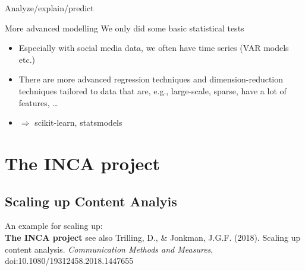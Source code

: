 \documentclass{beamer}
\begin{document}
\begin{frame}{Analyze/explain/predict}
	\begin{block}{More advanced modelling}
We only did some basic statistical tests
		\begin{itemize}
			\item Especially with social media data, we often have time series (VAR models etc.)
			\item There are more advanced regression techniques and dimension-reduction techniques tailored to data that are, e.g., large-scale, sparse, have a lot of features, \ldots
		\item $\Rightarrow$ scikit-learn, statsmodels
		\end{itemize}
	\end{block}
\end{frame}










\section{The INCA project}
\subsection{Scaling up Content Analyis}
\begin{frame}[plain]{}
An example for scaling up:\\
\textbf{The INCA project}
\vskip 3cm
\small{see also Trilling, D., \& Jonkman, J.G.F. (2018). Scaling up content analysis. \textit{Communication Methods and Measures}, doi:10.1080/19312458.2018.1447655}
\end{frame}



\begin{frame}[plain]
\end{frame}
\end{document}
